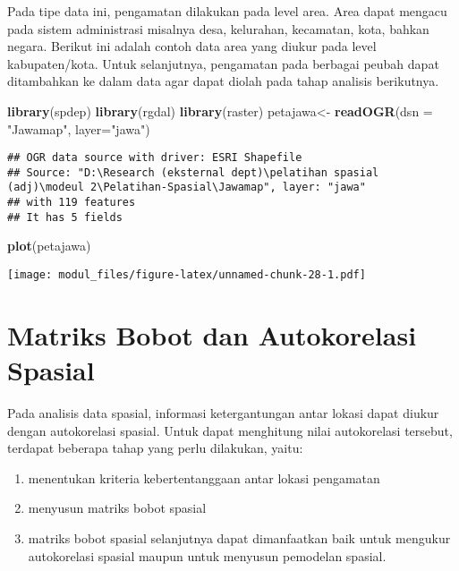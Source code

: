 \documentclass[
]{book}
\newenvironment{Shaded}{\begin{snugshade}}{\end{snugshade}}
\newcommand{\DataTypeTok}[1]{\textcolor[rgb]{0.13,0.29,0.53}{#1}}
\newcommand{\KeywordTok}[1]{\textcolor[rgb]{0.13,0.29,0.53}{\textbf{#1}}}
\newcommand{\NormalTok}[1]{#1}
\newcommand{\StringTok}[1]{\textcolor[rgb]{0.31,0.60,0.02}{#1}}
\begin{document}
Pada tipe data ini, pengamatan dilakukan pada level area. Area dapat mengacu pada sistem administrasi misalnya desa, kelurahan, kecamatan, kota, bahkan negara. Berikut ini adalah contoh data area yang diukur pada level kabupaten/kota. Untuk selanjutnya, pengamatan pada berbagai peubah dapat ditambahkan ke dalam data agar dapat diolah pada tahap analisis berikutnya.

\begin{Shaded}
\begin{Highlighting}[]
\KeywordTok{library}\NormalTok{(spdep)}
\KeywordTok{library}\NormalTok{(rgdal)}
\KeywordTok{library}\NormalTok{(raster)}
\NormalTok{petajawa\textless{}{-}}\StringTok{ }\KeywordTok{readOGR}\NormalTok{(}\DataTypeTok{dsn =} \StringTok{"Jawamap"}\NormalTok{, }\DataTypeTok{layer=}\StringTok{"jawa"}\NormalTok{)}
\end{Highlighting}
\end{Shaded}

\begin{verbatim}
## OGR data source with driver: ESRI Shapefile 
## Source: "D:\Research (eksternal dept)\pelatihan spasial (adj)\modeul 2\Pelatihan-Spasial\Jawamap", layer: "jawa"
## with 119 features
## It has 5 fields
\end{verbatim}

\begin{Shaded}
\begin{Highlighting}[]
\KeywordTok{plot}\NormalTok{(petajawa)}
\end{Highlighting}
\end{Shaded}

\texttt{[image: modul\_files/figure-latex/unnamed-chunk-28-1.pdf]}

\hypertarget{matriks-bobot-dan-autokorelasi-spasial}{%
\section{Matriks Bobot dan Autokorelasi Spasial}\label{matriks-bobot-dan-autokorelasi-spasial}}

Pada analisis data spasial, informasi ketergantungan antar lokasi dapat diukur dengan autokorelasi spasial. Untuk dapat menghitung nilai autokorelasi tersebut, terdapat beberapa tahap yang perlu dilakukan, yaitu:

\begin{enumerate}
\def\labelenumi{(\arabic{enumi})}
\item
  menentukan kriteria kebertentanggaan antar lokasi pengamatan
\item
  menyusun matriks bobot spasial
\item
  matriks bobot spasial selanjutnya dapat dimanfaatkan baik untuk mengukur autokorelasi spasial maupun untuk menyusun pemodelan spasial.
\end{enumerate}
\end{document}

